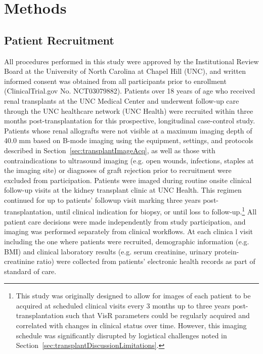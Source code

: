 \section{Methods}

\subsection{Patient Recruitment}

All procedures performed in this study were approved by the Institutional Review Board at the University of North Carolina at Chapel Hill (UNC), and written informed consent was obtained from all participants prior to enrollment (ClinicalTrial.gov No. NCT03079882). Patients over 18 years of age who received renal transplants at the UNC Medical Center and underwent follow-up care through the UNC healthcare network (UNC Health) were recruited within three months post-transplantation for this prospective, longitudinal case-control study. Patients whose renal allografts were not visible at a maximum imaging depth of 40.0 mm based on B-mode imaging using the equipment, settings, and protocols described in Section~\ref{sec:transplantImageAcq}, as well as those with contraindications to ultrasound imaging (e.g. open wounds, infections, staples at the imaging site) or diagnoses of graft rejection prior to recruitment were excluded from participation. Patients were imaged during routine onsite clinical follow-up visits at the kidney transplant clinic at UNC Health. This regimen continued for up to patients' followup visit marking three years post-transplantation, until clinical indication for biopsy, or until loss to follow-up.\footnote{
    This study was originally designed to allow for images of each patient to be acquired at scheduled clinical visits every 3 months up to three years post-transplantation such that VisR parameters could be regularly acquired and correlated with changes in clinical status over time. However, this imaging schedule was significantly disrupted by logistical challenges noted in Section~\ref{sec:transplantDiscussionLimitations}. 
} All patient care decisions were made independently from study participation, and imaging was performed separately from clinical workflows. At each clinica
l visit including the one where patients were recruited, demographic information (e.g. BMI) and clinical laboratory results (e.g. serum creatinine, urinary protein-creatinine ratio) were collected from patients' electronic health records as part of standard of care.

